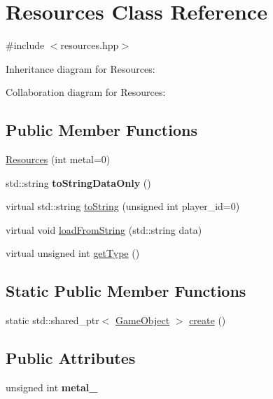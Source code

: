 \hypertarget{classResources}{}\section{Resources Class Reference}
\label{classResources}


{\ttfamily \#include $<$resources.\+hpp$>$}



Inheritance diagram for Resources\+:


Collaboration diagram for Resources\+:
\subsection*{Public Member Functions}
\begin{DoxyCompactItemize}
\item 
\hyperlink{classResources_a88c450c874f16921b3db4e5f18bcb0f8}{Resources} (int metal=0)
\item 
std\+::string {\bfseries to\+String\+Data\+Only} ()\hypertarget{classResources_ac4877d2c97641511f9f17d7623376e60}{}\label{classResources_ac4877d2c97641511f9f17d7623376e60}

\item 
virtual std\+::string \hyperlink{classResources_a2c7f9b4b9b3cf776f43b265ed0c8bdd5}{to\+String} (unsigned int player\+\_\+id=0)
\item 
virtual void \hyperlink{classResources_af52fa90c94244aabef9dd7c0b03c817e}{load\+From\+String} (std\+::string data)
\item 
virtual unsigned int \hyperlink{classResources_a5c61031db208f5d3c54c9f64c9f20ac3}{get\+Type} ()
\end{DoxyCompactItemize}
\subsection*{Static Public Member Functions}
\begin{DoxyCompactItemize}
\item 
static std\+::shared\+\_\+ptr$<$ \hyperlink{classGameObject}{Game\+Object} $>$ \hyperlink{classResources_a9f824eb39d28bc409e069c4a2d1da801}{create} ()
\end{DoxyCompactItemize}
\subsection*{Public Attributes}
\begin{DoxyCompactItemize}
\item 
unsigned int {\bfseries metal\+\_\+}\hypertarget{classResources_a0a353af07f4492deca9570e3c80bd7aa}{}\label{classResources_a0a353af07f4492deca9570e3c80bd7aa}

\end{DoxyCompactItemize}
